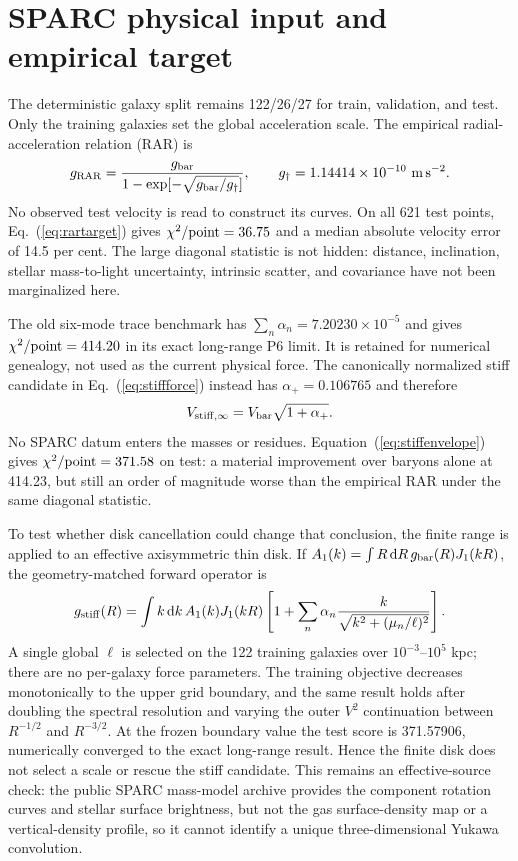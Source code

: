 \documentclass[10pt]{article}
\newcommand{\dd}{\mathrm{d}}
\begin{document}
\section{SPARC physical input and empirical target}

The deterministic galaxy split remains 122/26/27 for train, validation, and
test.  Only the training galaxies set the global acceleration scale.  The
empirical radial-acceleration relation (RAR) is
\begin{equation}
 g_{\rm RAR}=\frac{g_{\rm bar}}
 {1-\exp[-\sqrt{g_{\rm bar}/g_\dagger}]},
 \qquad g_\dagger=1.14414\times10^{-10}\ {\rm m\,s^{-2}}.
 \label{eq:rartarget}
\end{equation}
No observed test velocity is read to construct its curves.  On all 621 test
points, Eq.~(\ref{eq:rartarget}) gives $\chi^2/{\rm point}=36.75$ and a median
absolute velocity error of 14.5 per cent.  The large diagonal statistic is not
hidden: distance, inclination, stellar mass-to-light uncertainty, intrinsic
scatter, and covariance have not been marginalized here.

The old six-mode trace benchmark has
$\sum_n\alpha_n=7.20230\times10^{-5}$ and gives
$\chi^2/{\rm point}=414.20$ in its exact long-range P6 limit.  It is retained
for numerical genealogy, not used as the current physical force.  The
canonically normalized stiff candidate in Eq.~(\ref{eq:stiffforce}) instead
has $\alpha_+=0.106765$ and therefore
\begin{equation}
 V_{\rm stiff,\infty}=V_{\rm bar}\sqrt{1+\alpha_+}.
 \label{eq:stiffenvelope}
\end{equation}
No SPARC datum enters the masses or residues.  Equation~(\ref{eq:stiffenvelope})
gives $\chi^2/{\rm point}=371.58$ on test: a material improvement over baryons
alone at 414.23, but still an order of magnitude worse than the empirical RAR
under the same diagonal statistic.

To test whether disk cancellation could change that conclusion, the finite
range is applied to an effective axisymmetric thin disk.  If
$A_1(k)=\int R\,\dd R\,g_{\rm bar}(R)J_1(kR)$, the geometry-matched forward
operator is
\begin{equation}
 g_{\rm stiff}(R)=\int k\,\dd k\,A_1(k)J_1(kR)
 \left[1+\sum_n\alpha_n\frac{k}{\sqrt{k^2+(\mu_n/\ell)^2}}\right].
 \label{eq:diskhankel}
\end{equation}
A single global $\ell$ is selected on the 122 training galaxies over
$10^{-3}$--$10^5$ kpc; there are no per-galaxy force parameters.  The training
objective decreases monotonically to the upper grid boundary, and the same
result holds after doubling the spectral resolution and varying the outer
$V^2$ continuation between $R^{-1/2}$ and $R^{-3/2}$.  At the frozen boundary
value the test score is 371.57906, numerically converged to the exact
long-range result.  Hence the finite disk does not select a scale or rescue
the stiff candidate.  This remains an effective-source check: the public
SPARC mass-model archive provides the component rotation curves and stellar
surface brightness, but not the gas surface-density map or a vertical-density
profile, so it cannot identify a unique three-dimensional Yukawa convolution.
\end{document}
